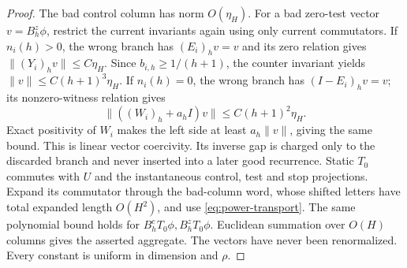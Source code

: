 \begin{proof}
The bad control column has norm $O(\eta_H)$. For a bad zero-test vector $v=B_h^z\phi$, restrict the current invariants again using only current commutators. If $n_i(h)>0$, the wrong branch has $(E_i)_hv=v$ and its zero relation gives $\|(Y_i)_hv\|\le C\eta_H$. Since $b_{i,h}\ge1/(h+1)$, the counter invariant yields $\|v\|\le C(h+1)^3\eta_H$. If $n_i(h)=0$, the wrong branch has $(I-E_i)_hv=v$; its nonzero-witness relation gives
\[
 \|((W_i)_h+a_hI)v\|\le C(h+1)^2\eta_H.
\]
Exact positivity of $W_i$ makes the left side at least $a_h\|v\|$, giving the same bound. This is linear vector coercivity. Its inverse gap is charged only to the discarded branch and never inserted into a later good recurrence.
Static $T_0$ commutes with $U$ and the instantaneous control, test and stop projections. Expand its commutator through the bad-column word, whose shifted letters have total expanded length $O(H^2)$, and use \eqref{eq:power-transport}. The same polynomial bound holds for $B_h^cT_0\phi,B_h^zT_0\phi$. Euclidean summation over $O(H)$ columns gives the asserted aggregate. The vectors have never been renormalized. Every constant is uniform in dimension and $\rho$.
\end{proof}

